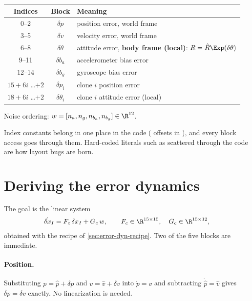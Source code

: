 \begin{convention}
\begin{center}\small
\begin{tabular}{@{}c c l@{}}
\toprule
Indices & Block & Meaning \\
\midrule
0--2 & $\delta p$ & position error, world frame \\
3--5 & $\delta v$ & velocity error, world frame \\
6--8 & $\delta\theta$ & attitude error, \textbf{body frame (local)}: $R = \hat R\Exp(\delta\theta)$ \\
9--11 & $\delta b_a$ & accelerometer bias error \\
12--14 & $\delta b_g$ & gyroscope bias error \\
$15+6i$ \dots $+2$ & $\delta p_i$ & clone $i$ position error \\
$18+6i$ \dots $+2$ & $\delta\theta_i$ & clone $i$ attitude error (local) \\
\bottomrule
\end{tabular}
\end{center}
Noise ordering: $w = [n_a, n_g, n_{b_a}, n_{b_g}] \in \R^{12}$.
\end{convention}

Index constants belong in one place in the code ( offsets in ), and every block
access goes through them. Hard-coded literals such as  scattered through the code are how
layout bugs are born.

\section{Deriving the error dynamics}
\label{sec:deriving-Fc}

The goal is the linear system
\begin{equation}
  \dot{\delta x}_I = F_c\,\delta x_I + G_c\,w, \qquad F_c \in \R^{15\times15},\quad G_c \in \R^{15\times12},
\end{equation}
obtained with the recipe of \cref{sec:error-dyn-recipe}. Two of the five blocks are immediate.

\paragraph{Position.} Substituting $p = \hat p + \delta p$ and $v = \hat v + \delta v$ into $\dot p = v$ and subtracting
$\dot{\hat p} = \hat v$ gives $\dot{\delta p} = \delta v$ exactly. No linearization is needed.

